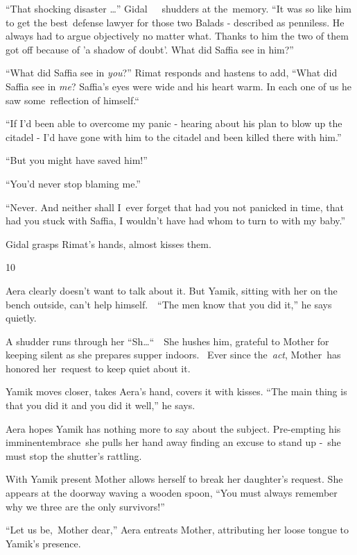 \documentclass[twoside,11pt]{book}
\begin{document}
``That shocking disaster {\dots}'' Gidal{\ \ \ }shudders at
the{\ }memory. ``It was so like him to get the best~defense lawyer for those two Balads -
described as penniless. He always had to argue objectively no matter what. Thanks to him the two of them got off
because of 'a shadow of doubt'. What did Saffia see in him?'' 

``What did Saffia see in \textit{you}?'' Rimat responds and hastens to add,
``What did Saffia see in \textit{me}? Saffia's eyes were wide and his heart warm. In each one of us he saw
some\ reflection of himself.``\ 

``If I'd been able to overcome my panic - hearing about his plan to blow up the citadel - I'd have gone
with him to the citadel and been killed there with him.'' 

``But you might have saved him!'' 

``You'd never stop blaming me.'' 

``Never. And neither shall I\ ever forget that had you not panicked in time, that had you stuck with
Saffia, I wouldn't have had whom to turn to with my baby.''

Gidal grasps Rimat's hands, almost kisses them. ~


\bigskip

10 

Aera clearly doesn't want to talk about it. But Yamik, sitting with her on the bench outside, can't help
himself.\ \ ``The men know that you did it,'' he says quietly.

A shudder runs through her ``Sh{\dots}``\ \ She hushes him, grateful to Mother for keeping
silent as she prepares supper indoors.~ Ever since the\ \textit{act}, Mother~has honored her\ request to keep quiet
about it.\ 

Yamik moves closer, takes Aera's hand, covers it with kisses. ``The main thing is that you did it and you
did it well,'' he says.

Aera hopes Yamik has nothing more to say about the subject. Pre-empting his imminentembrace\ she pulls her hand away
finding an excuse to stand up -\ she must stop the shutter's rattling.\ 

With Yamik present Mother allows herself to break her daughter's request. She appears at the doorway waving a wooden
spoon, ``You must always remember why we three are the only survivors!'' 

``Let us be,\ Mother dear,'' Aera entreats Mother, attributing her loose tongue to Yamik's
presence.
\end{document}
